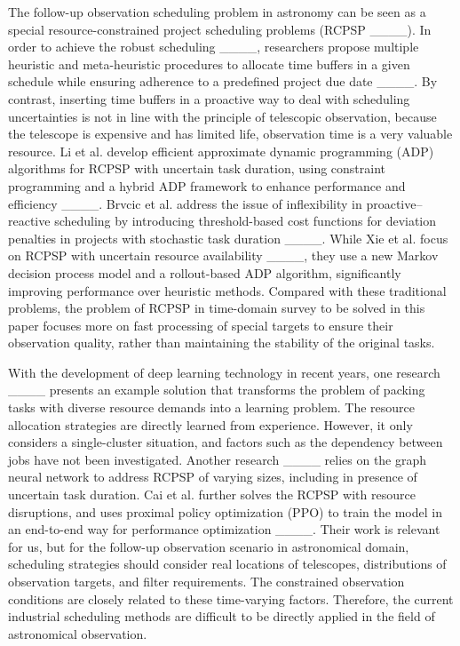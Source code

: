 The follow-up observation scheduling problem in astronomy can be seen as a special resource-constrained project scheduling problems (RCPSP ____). In order to achieve the robust scheduling ____, researchers propose multiple heuristic and meta-heuristic procedures to allocate time buffers in a given schedule while ensuring adherence to a predefined project due date ____. By contrast, inserting time buffers in a proactive way to deal with scheduling uncertainties is not in line with the principle of telescopic observation, because the telescope is expensive and has limited life, observation time is a very valuable resource. Li et al. develop efficient approximate dynamic programming (ADP) algorithms for RCPSP with uncertain task duration, using constraint programming and a hybrid ADP framework to enhance performance and efficiency ____. Brvcic et al. address the issue of inflexibility in proactive–reactive scheduling by introducing threshold-based cost functions for deviation penalties in projects with stochastic task duration ____. While Xie et al. focus on RCPSP with uncertain resource availability ____, they use a new Markov decision process model and a rollout-based ADP algorithm, significantly improving performance over heuristic methods. Compared with these traditional problems, the problem of RCPSP in time-domain survey to be solved in this paper focuses more on fast processing of special targets to ensure their observation quality, rather than maintaining the stability of the original tasks. 


With the development of deep learning technology in recent years, one research ____ presents an example solution that transforms the problem of packing tasks with diverse resource demands into a learning problem. The resource allocation strategies are directly learned from experience. However, it only considers a single-cluster situation, and factors such as the dependency between jobs have not been investigated. Another research ____ relies on the graph neural network to address RCPSP of varying sizes, including in presence of uncertain task duration. Cai et al. further solves the RCPSP with resource disruptions, and uses proximal policy optimization (PPO) to train the model in an end-to-end way for performance optimization ____. Their work is relevant for us, but for the follow-up observation scenario in astronomical domain, scheduling strategies should consider real locations of telescopes, distributions of observation targets, and filter requirements. The constrained observation conditions are closely related to these time-varying factors. Therefore, the current industrial scheduling methods are difficult to be directly applied in the field of astronomical observation.

